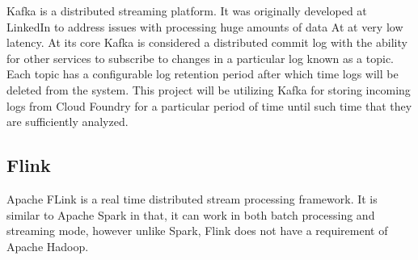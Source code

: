 Kafka is a distributed streaming platform. It was originally developed at LinkedIn to address issues with processing huge amounts of data  At at very low latency. At its core Kafka is considered a distributed commit log with the ability for other services to subscribe to changes in a particular log known as a topic. Each topic has a configurable log retention period after which time logs will be deleted from the system. This project will be utilizing Kafka for storing incoming logs from Cloud Foundry for a particular period of time until such time that they are sufficiently analyzed. 

\subsection{Flink}

Apache FLink is a real time distributed stream processing framework. It is similar to Apache Spark in that, it can work in both batch processing and streaming mode, however unlike Spark, Flink does not have a requirement of Apache Hadoop.